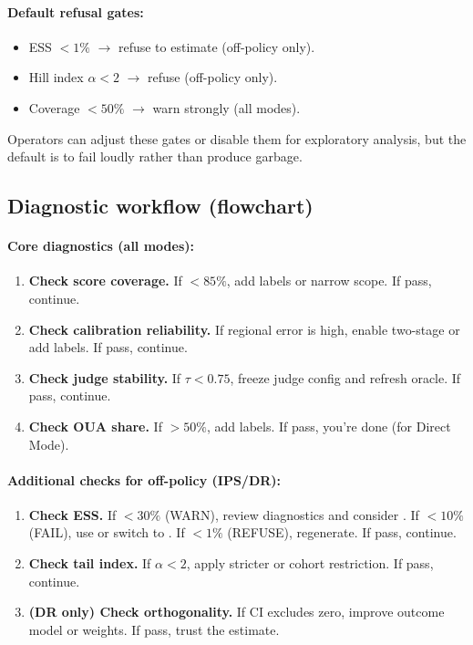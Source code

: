\paragraph{Default refusal gates:}
\begin{itemize}
\item ESS $< 1\%$ $\to$ refuse to estimate (off-policy only).
\item Hill index $\alpha < 2$ $\to$ refuse (off-policy only).
\item Coverage $< 50\%$ $\to$ warn strongly (all modes).
\end{itemize}

Operators can adjust these gates or disable them for exploratory analysis, but the default is to fail loudly rather than produce garbage.

\subsection{Diagnostic workflow (flowchart)}

\paragraph{Core diagnostics (all modes):}
\begin{enumerate}
\item \textbf{Check score coverage.} If $< 85\%$, add labels or narrow scope. If pass, continue.
\item \textbf{Check calibration reliability.} If regional error is high, enable two-stage \autocal{} or add labels. If pass, continue.
\item \textbf{Check judge stability.} If $\tau < 0.75$, freeze judge config and refresh oracle. If pass, continue.
\item \textbf{Check OUA share.} If $> 50\%$, add labels. If pass, you're done (for Direct Mode).
\end{enumerate}

\paragraph{Additional checks for off-policy (IPS/DR):}
\begin{enumerate}[resume]
\item \textbf{Check ESS.} If $< 30\%$ (WARN), review diagnostics and consider \dr. If $< 10\%$ (FAIL), use \simcal{} or switch to \dr. If $< 1\%$ (REFUSE), regenerate. If pass, continue.
\item \textbf{Check tail index.} If $\alpha < 2$, apply stricter \simcal{} or cohort restriction. If pass, continue.
\item \textbf{(DR only) Check orthogonality.} If CI excludes zero, improve outcome model or weights. If pass, trust the estimate.
\end{enumerate}

